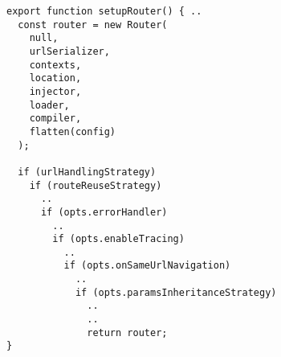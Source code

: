 \begin{verbatim}
export function setupRouter() { ..
  const router = new Router(
    null,
    urlSerializer,
    contexts,
    location,
    injector,
    loader,
    compiler,
    flatten(config)
  );

  if (urlHandlingStrategy)
    if (routeReuseStrategy)
      ..
      if (opts.errorHandler)
        ..
        if (opts.enableTracing)
          ..
          if (opts.onSameUrlNavigation)
            ..
            if (opts.paramsInheritanceStrategy)
              ..
              ..
              return router;
}
\end{verbatim}
